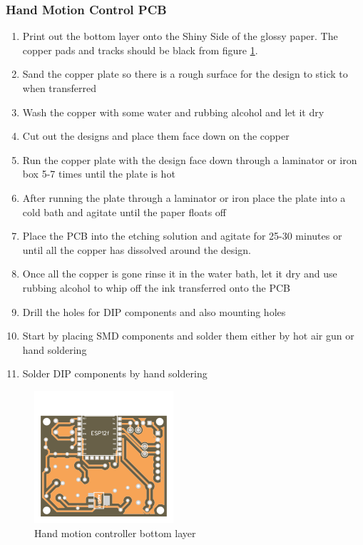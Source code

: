 \subsubsection{Hand Motion Control PCB}
\begin{enumerate}
    \item Print out the bottom layer onto the Shiny Side of the glossy paper. The copper pads and tracks should be black from figure \ref{fig:HMbottomlayer}.
    \item Sand the copper plate so there is a rough surface for the design to stick to when transferred
    \item Wash the copper with some water and rubbing alcohol and let it dry
    \item Cut out the designs and place them face down on the copper
    \item Run the copper plate with the design face down through a laminator or iron box 5-7 times until the plate is hot 
    \item After running the plate through a laminator or iron place the plate into a cold bath and agitate until the paper floats off
    \item Place the PCB into the etching solution and agitate for 25-30 minutes or until all the copper has dissolved around the design.
    \item Once all the copper is gone rinse it in the water bath, let it dry and use rubbing alcohol to whip off the ink transferred onto the PCB
    \item Drill the holes for DIP components and also mounting holes
    \item Start by placing SMD components and solder them either by hot air gun or hand soldering
    \item Solder DIP components by hand soldering
\end{enumerate}

\begin{figure}[H]
    \centering
    \includegraphics[scale=0.9]{Figures/pcb_bottom.png}
    \caption{Hand motion controller bottom layer}
    \label{fig:HMbottomlayer}
\end{figure}

